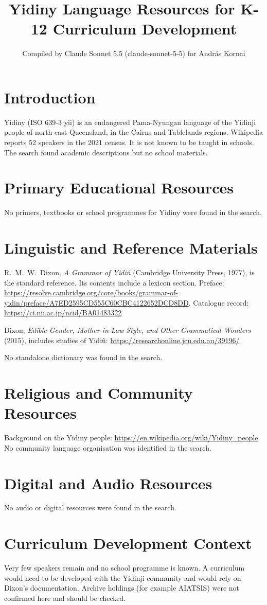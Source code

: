 \documentclass[12pt]{article}
\title{Yidiny Language Resources for K-12 Curriculum Development}
\author{Compiled by Claude Sonnet 5.5 (claude-sonnet-5-5) for Andr\'as Kornai}
\date{}
\begin{document}
\maketitle
\section{Introduction}
Yidiny (ISO 639-3 yii) is an endangered Pama-Nyungan language of the Yidinji people of north-east Queensland, in the Cairns and Tablelands regions. Wikipedia reports 52 speakers in the 2021 census. It is not known to be taught in schools. The search found academic descriptions but no school materials.
\section{Primary Educational Resources}
No primers, textbooks or school programmes for Yidiny were found in the search.
\section{Linguistic and Reference Materials}
R.\ M.\ W.\ Dixon, \emph{A Grammar of Yidi\~n} (Cambridge University Press, 1977), is the standard reference. Its contents include a lexicon section. Preface: \url{https://resolve.cambridge.org/core/books/grammar-of-yidin/preface/A7ED2595CD555C60CBC4122652DCD8DD}. Catalogue record: \url{https://ci.nii.ac.jp/ncid/BA01483322}

Dixon, \emph{Edible Gender, Mother-in-Law Style, and Other Grammatical Wonders} (2015), includes studies of Yidi\~n: \url{https://researchonline.jcu.edu.au/39196/}

No standalone dictionary was found in the search.
\section{Religious and Community Resources}
Background on the Yidiny people: \url{https://en.wikipedia.org/wiki/Yidiny_people}. No community language organisation was identified in the search.
\section{Digital and Audio Resources}
No audio or digital resources were found in the search.
\section{Curriculum Development Context}
Very few speakers remain and no school programme is known. A curriculum would need to be developed with the Yidinji community and would rely on Dixon's documentation. Archive holdings (for example AIATSIS) were not confirmed here and should be checked.
\end{document}
